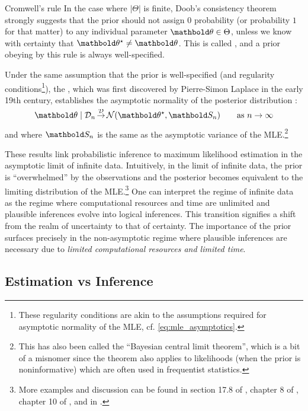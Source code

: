 \begin{rmk}{Cromwell's rule}{}
  In the case where $|\Theta|$ is finite, Doob's consistency theorem strongly suggests that the prior should not assign $0$ probability (or probability $1$ for that matter) to any individual parameter $\vtheta \in \Theta$, unless we know with certainty that $\opt{\vtheta} \neq \vtheta$.
  This is called , and a prior obeying by this rule is always well-specified.
\end{rmk}

Under the same assumption that the prior is well-specified (and regularity conditions\footnote{These regularity conditions are akin to the assumptions required for asymptotic normality of the MLE, cf. \cref{eq:mle_asymptotics}.}), the , which was first discovered by Pierre-Simon Laplace in the early 19th century, establishes the asymptotic normality of the posterior distribution \citep{van2000asymptotic,miller2016lecture}: \begin{align}
  \vtheta \mid \spD_n \convd \N{\opt{\vtheta}}{\mS_n} \qquad\text{as $n \to \infty$}
\end{align} and where $\mS_n$ is the same as the asymptotic variance of the MLE.\footnote{This has also been called the ``Bayesian central limit theorem'', which is a bit of a misnomer since the theorem also applies to likelihoods (when the prior is noninformative) which are often used in frequentist statistics.}

These results link probabilistic inference to maximum likelihood estimation in the asymptotic limit of infinite data.
Intuitively, in the limit of infinite data, the prior is ``overwhelmed'' by the observations and the posterior becomes equivalent to the limiting distribution of the MLE.\footnote{More examples and discussion can be found in section 17.8 of \cite{le2012asymptotic}, chapter 8 of \cite{le2000asymptotics}, chapter 10 of \cite{van2000asymptotic}, and in \cite{tanner1993tools}.}
One can interpret the regime of infinite data as the regime where computational resources and time are unlimited and plausible inferences evolve into logical inferences.
This transition signifies a shift from the realm of uncertainty to that of certainty.
The importance of the prior surfaces precisely in the non-asymptotic regime where plausible inferences are necessary due to \emph{limited computational resources and limited time}.

\subsection{Estimation vs Inference}

